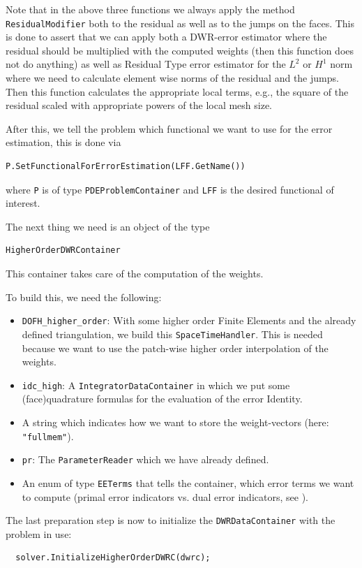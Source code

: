 Note that in the above three functions we always apply the method \texttt{ResidualModifier} both to the 
residual as well as to the jumps on the faces. This is done to assert that we can apply both a 
DWR-error estimator where the residual should be multiplied with the computed weights (then this function 
does not do anything) as well as Residual Type error estimator for the $L^2$ or $H^1$ norm where we need to calculate element wise norms of the residual and the jumps. Then this function calculates the appropriate 
local terms, e.g., the square of the residual scaled with appropriate powers of the local mesh size.



After this, we tell the problem which functional we want to use for the error estimation, this is done via
\begin{verbatim}
P.SetFunctionalForErrorEstimation(LFF.GetName())
\end{verbatim}
where \texttt{P} is of type \texttt{PDEProblemContainer} and \texttt{LFF} is the desired functional of interest. 

The next thing we need is an object of the type
\begin{verbatim}
HigherOrderDWRContainer
\end{verbatim}
This container takes care of the computation of the weights.

To build this, we need the following:
\begin{itemize}
\item {\verb!DOFH_higher_order!}: With some higher order Finite Elements and the already defined triangulation, we build this \texttt{SpaceTimeHandler}. This is needed because  we want to use the patch-wise higher order interpolation of the weights.
\item {\verb!idc_high!}: A \texttt{IntegratorDataContainer} in which we put some (face)quadrature formulas for the evaluation of the error Identity.
\item A string which indicates how we want to store the weight-vectors (here: { \verb!"fullmem"!}).
\item \texttt{pr}: The \texttt{ParameterReader} which we have already defined.
\item An enum of type \texttt{EETerms} that tells the container, which error terms we want to compute (primal error indicators vs. dual error indicators, see \cite{BR03}).  
\end{itemize}
The last preparation step is now to initialize the \texttt{DWRDataContainer} with the problem in use:
\begin{verbatim}
  solver.InitializeHigherOrderDWRC(dwrc);
\end{verbatim}


